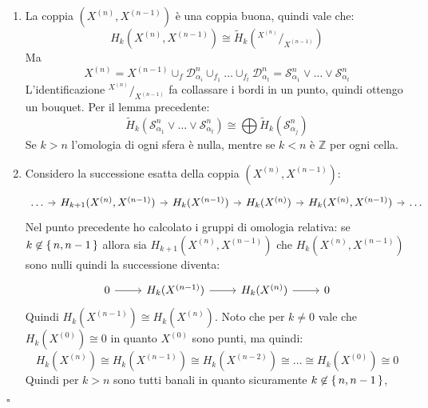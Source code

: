 \documentclass[10pt, twoside=false, x11names]{scrbook}
\newenvironment{proof}{{\textbf{Dimostrazione}:}}{\hfill $\square$}
\newcommand{\Z}{\mathbb{Z}}
\newcommand{\Sph}[1][]{\mathcal{S}^#1}
\newcommand{\Disk}[1][]{\mathcal{D}^#1}
\newcommand*\quot[2]{{^{\textstyle #1}\big/_{\textstyle #2}}}
\begin{document}
\begin{proof}
  \begin{enumerate}
  \item
    La coppia $ (X^{(n)}, X^{(n-1)}) $ è una coppia buona, quindi vale che:
    \[
      H_k(X^{(n)}, X^{(n-1)}) \cong \tilde{H}_k(\quot{X^{(n)}}{X^{(n-1)}})
    \]
    Ma
    \[
      X^{(n)} = X^{(n-1)} \cup_f \Disk{n}_{\alpha_i} \cup_{f_1} \dots \cup_{f_t} \Disk{n}_{\alpha_t} = \Sph{n}_{\alpha_1} \vee \dots \vee \Sph{n}_{\alpha_t}
    \]
    L'identificazione $ \quot{X^{(n)}}{X^{(n-1)}} $ fa collassare i bordi in un punto, quindi ottengo
    un bouquet.
    Per il lemma precedente:
    \[
      \tilde{H}_k(\Sph{n}_{\alpha_1} \vee \dots \vee \Sph{n}_{\alpha_t}) \cong \bigoplus \tilde{H}_k(\Sph{n}_{\alpha_j})
    \]
    Se $ k > n $ l'omologia di ogni sfera è nulla, mentre
    se $ k < n $ è $ \Z $ per ogni cella.
  \item
    Considero la successione esatta della coppia $ (X^{(n)}, X^{(n-1)}) $:
    \[
      \begin{tikzcd}[nodes={column sep=7pt}]
        \dots \rar & H_{k+1}(X^{(n)}, X^{(n-1)}) \rar & H_k(X^{(n-1)}) \rar & H_k(X^{(n)}) \rar & H_{k}(X^{(n)}, X^{(n-1)}) \rar & \dots
      \end{tikzcd}
    \]
    Nel punto precedente ho calcolato i gruppi di omologia relativa:
    se $ k \not \in \set{n, n-1} $ allora sia
    $ H_{k+1}(X^{(n)}, X^{(n-1)}) $ che $ H_k(X^{(n)}, X^{(n-1)}) $ sono nulli
    quindi la successione diventa:
    \[
      \begin{tikzcd}
        0 \rar   & H_k(X^{(n-1)}) \rar  & H_k(X^{(n)}) \rar & 0
      \end{tikzcd}
    \]
    Quindi $ H_k(X^{(n-1)}) \cong H_k(X^{(n)}) $. Noto che per $ k \not = 0 $ vale che
    $ H_k(X^{(0)}) \cong 0 $ in quanto $ X^{(0)} $ sono punti,
    ma quindi:
    \[
      H_k(X^{(n)}) \cong  H_k(X^{(n-1)}) \cong H_k(X^{(n-2)}) \cong \dots \cong H_k(X^{(0)}) \cong 0
    \]
    Quindi per $ k > n $ sono tutti banali in quanto sicuramente $ k \not \in \set{n, n-1} $,


\end{enumerate}
\end{proof}
\end{document}
